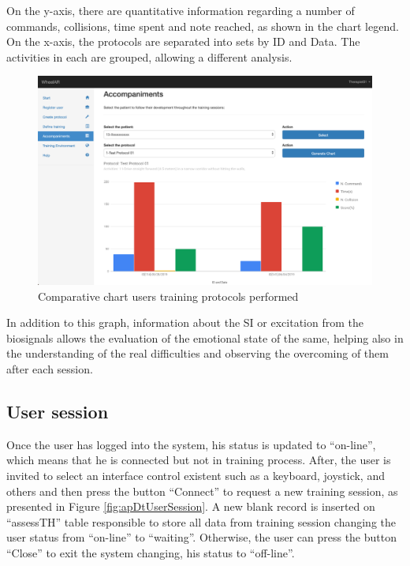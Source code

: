 On the y-axis, there are quantitative information regarding a number of commands, collisions, time spent and note reached, as shown in the chart legend. On the x-axis, the protocols are separated into sets by ID and Data. The activities in each are grouped, allowing a different analysis.

\begin{figure}[!hbt]
\begin{center}
\includegraphics[width=1\linewidth]{img/apendiceD/tGenerateChart02}
\caption{Comparative chart users training protocols performed} \label{fig:apDtGenerateChart02}
\end{center}
\vspace{-15pt}
\end{figure}


In addition to this graph, information about the SI or excitation from the biosignals allows the evaluation of the emotional state of the same, helping also in the understanding of the real difficulties and observing the overcoming of them after each session. 


\subsection{User session}

Once the user has logged into the system, his status is updated to ``on-line'', which means that he is connected but not in training process. After, the user is invited to select an interface control existent such as a keyboard, joystick, and others and then press the button ``Connect'' to request a new training session, as presented in Figure \ref{fig:apDtUserSession}. A new blank record is inserted on ``assessTH'' table responsible to store all data from training session changing the user status from ``on-line'' to ``waiting''. Otherwise, the user can press the button ``Close'' to  exit the system changing, his status to ``off-line''. 


